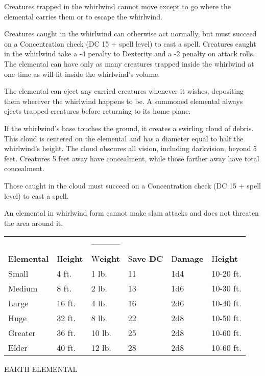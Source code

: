 \documentclass{article}
\begin{document}
Creatures trapped in the whirlwind cannot move except to go where the elemental 
carries them or to escape the whirlwind.

Creatures caught in the whirlwind can otherwise act normally, but must succeed 
on a Concentration check (DC 15 + spell level) to cast a spell. Creatures caught 
in the whirlwind take a -4 penalty to Dexterity and a -2 penalty on attack rolls. 
The elemental can have only as many creatures trapped inside the whirlwind at one 
time as will fit inside the whirlwind's volume.

The elemental can eject any carried creatures whenever it wishes, depositing them 
wherever the whirlwind happens to be. A summoned elemental always ejects trapped 
creatures before returning to its home plane.

If the whirlwind's base touches the ground, it creates a swirling cloud of debris. 
This cloud is centered on the elemental and has a diameter equal to half the whirlwind's 
height. The cloud obscures all vision, including darkvision, beyond 5 feet. Creatures 
5 feet away have concealment, while those farther away have total concealment.

Those caught in the cloud must succeed on a Concentration check (DC 15 + spell 
level) to cast a spell.

An elemental in whirlwind form cannot make slam attacks and does not threaten the 
area around it.

\begin{tabular}{|>{\raggedright}p{42pt}|>{\raggedright}p{27pt}|>{\raggedright}p{29pt}|>{\raggedright}p{36pt}|>{\raggedright}p{34pt}|>{\raggedright}p{35pt}|}
\hline
\multicolumn{6}{|p{206pt}|}{A\textbf{ir Elemental Sizes}}\tabularnewline
\hline
 &  & ----------- & \multicolumn{3}{p{106pt}|}{ \textbf{Whirlwind -----------}}\tabularnewline
\hline
E\textbf{lemental} & H\textbf{eight} & W\textbf{eight} & S\textbf{ave DC} & D\textbf{amage} & H\textbf{eight}\tabularnewline
\hline
Small & 4 ft. & 1 lb. & 11 & 1d4 & 10-20 ft.\tabularnewline
\hline
Medium & 8 ft. & 2 lb. & 13 & 1d6 & 10-30 ft.\tabularnewline
\hline
Large & 16 ft. & 4 lb. & 16 & 2d6 & 10-40 ft.\tabularnewline
\hline
Huge & 32 ft. & 8 lb. & 22 & 2d8 & 10-50 ft.\tabularnewline
\hline
Greater & 36 ft. & 10 lb. & 25 & 2d8 & 10-60 ft.\tabularnewline
\hline
Elder & 40 ft. & 12 lb. & 28 & 2d8 & 10-60 ft.\tabularnewline
\hline
\end{tabular}

\vspace{12pt}
EARTH ELEMENTAL
\end{document}
